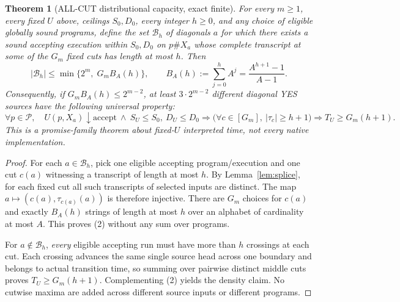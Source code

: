 \documentclass[11pt]{article}
\newtheorem{theorem}{Theorem}
\begin{document}
\begin{theorem}[ALL-CUT distributional capacity, exact finite]
\label{th:allcuts}
For every $m\ge1$, every fixed $U$ above, ceilings
$S_0,D_0$, every integer $h\ge0$, and any choice
of eligible globally sound programs, define the set
$\mathcal B_h$ of diagonals $a$ for which there
\emph{exists} a sound accepting execution within
$S_0,D_0$ on $p\#X_a$ whose complete transcript
at \emph{some} of the $G_m$ fixed cuts has length
at most $h$. Then
\[
 \boxed{|\mathcal B_h|\le
   \min\{2^m,\;G_m B_A(h)\}},\qquad
 B_A(h):=\sum_{j=0}^h A^j
       =\frac{A^{h+1}-1}{A-1}.                 \tag{2}
\]
Consequently, if $G_mB_A(h)\le2^{m-2}$, at least
$3\cdot 2^{m-2}$ different diagonal YES sources
have the following \emph{universal} property:
\[
 \forall p\in\mathcal P,\quad
  U(p,X_a)\downarrow\mathrm{accept}
  \ \wedge\ S_U\le S_0,\ D_U\le D_0
 \Longrightarrow
   \bigl(\forall c\in [G_m],\ |\tau_c|\ge h+1\bigr)
 \Longrightarrow T_U\ge G_m(h+1).           \tag{3}
\]
This is a promise-family theorem about fixed-$U$
\emph{interpreted} time, not every native implementation.
\end{theorem}
\begin{proof}
For each $a\in\mathcal B_h$, pick one eligible accepting
program/execution and one cut $c(a)$ witnessing a transcript
of length at most $h$. By Lemma~\ref{lem:splice}, for
each fixed cut all such transcripts of selected inputs
are distinct. The map $a\mapsto(c(a),\tau_{c(a)}(a))$
is therefore injective. There are $G_m$ choices for
$c(a)$ and exactly $B_A(h)$ strings of length at most
$h$ over an alphabet of cardinality at most $A$.
This proves (2) without any sum over programs.

For $a\notin\mathcal B_h$, \emph{every} eligible
accepting run must have more than $h$ crossings at
each cut. Each crossing advances the same single
source head across one boundary and belongs to
actual transition time, so summing over pairwise
distinct middle cuts proves $T_U\ge G_m(h+1)$.
Complementing (2) yields the density claim.
No cutwise maxima are added across different
source inputs or different programs.
\end{proof}
\end{document}
